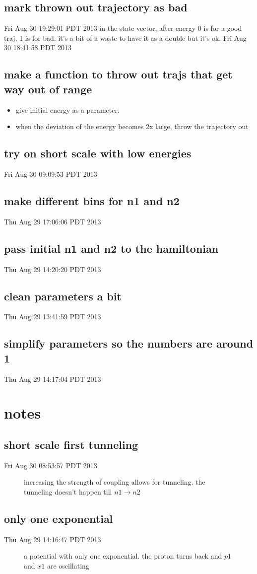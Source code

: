 \documentclass{article}
\let\Item\item
\renewcommand\item{\normalcolor\Item}
\begin{document}
\subsection{mark thrown out trajectory as bad}
Fri Aug 30 19:29:01 PDT 2013
in the state vector, after energy 0 is for a good traj, 1 is for bad. it's a bit of a waste to have it as a double but it's ok.
Fri Aug 30 18:41:58 PDT 2013
\subsection{make a function to throw out trajs that get way out of range}
\begin{itemize}
  \item give initial energy as a parameter.
  \item when the deviation of the energy becomes 2x large, throw the trajectory out
\end{itemize}
\subsection{try on short scale with low energies}
Fri Aug 30 09:09:53 PDT 2013
\subsection{make different bins for n1 and n2}
Thu Aug 29 17:06:06 PDT 2013
\subsection{pass initial n1 and n2 to the hamiltonian}
Thu Aug 29 14:20:20 PDT 2013
\subsection{clean parameters a bit}
Thu Aug 29 13:41:59 PDT 2013
\subsection{simplify parameters so the numbers are around 1}
Thu Aug 29 14:17:04 PDT 2013
\section{notes}
\subsection{short scale first tunneling}
Fri Aug 30 08:53:57 PDT 2013
\begin{figure}[H]
  \centering
  
  \caption{increasing the strength of coupling allows for tunneling. the tunneling doesn't happen till $n1\to n2$}
  \label{fig:tunnel01}
\end{figure}

\subsection{only one exponential}
Thu Aug 29 14:16:47 PDT 2013
\begin{figure}[H]
  \centering
  
  \caption{a potential with only one exponential. the proton turns back and $p1$ and $x1$ are oscillating}
  \label{fig:oneexp}
\end{figure}
\end{document}
